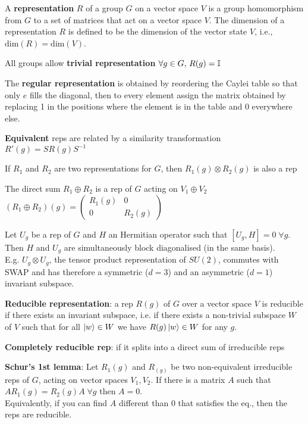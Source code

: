 \begin{squishlist}
    \item A \textbf{representation} $R$ of a group $G$ on a vector space
    $V$ is a group homomorphism from $G$ to a set of matrices that act on a vector space $V$.
    The dimension of a representation $R$ is defined to be the dimension of the vector state $V$, i.e.,
    $\text{dim}(R)=\text{dim}(V)$.
    \item All groups allow \textbf{trivial representation} $\forall g \in G, \, R(g) = \mathbb{I}$
    \item The \textbf{regular representation} is obtained by reordering the Caylei table so that only $e$ fills the diagonal, then to every element assign the matrix obtained by replacing 1 in the positions where the element is in the table and 0 everywhere else.
    \item \textbf{Equivalent} reps are related by a similarity transformation $R'(g) = S R(g) S^{-1}$
    \item If $R_1$ and $R_2$ are two representations for $G$, then $R_1(g) \otimes R_2(g)$ is also a rep
    \item The direct sum $R_1 \oplus R_2$ is a rep of $G$ acting on $V_1 \oplus V_2$ \\
    $(R_1 \oplus R_2)(g) = \begin{pmatrix} R_1(g) & 0 \\ 0 & R_2(g) \end{pmatrix}$

    \item Let $U_g$ be a rep of $G$ and $H$ an Hermitian operator such that $[U_g,H] = 0 \; \forall g$. Then $H$ and $U_g$ are simultaneously block diagonalised (in the same basis). \\
    E.g. $U_g \otimes U_g$, the tensor product representation of $SU(2)$, commutes with SWAP and has therefore a symmetric ($d=3$) and an asymmetric ($d=1$) invariant subspace.
    \item \textbf{Reducible representation}: a rep $R(g)$ of $G$ over a vector space $V$ is reducible if there exists an invariant subspace, i.e. if there exists a non-trivial subspace $W$ of $V$ such that for all $\ket{w} \in W$ we have $R(g) \ket{w} \in W$ for any $g$.
    \item \textbf{Completely reducible rep}: if it splits into a direct sum of irreducible reps
    
    \item \textbf{Schur's 1st lemma}: Let $R_1(g)$ and $R_(g)$ be two non-equivalent irreducible reps of $G$, acting on vector spaces $V_1, V_2$. If there is a matrix $A$ such that \\ $A R_1(g) = R_2(g) A \; \forall g$ \quad then $A=0$.\\
    Equivalently, if you can find $A$ different than 0 that satisfies the eq., then the reps are reducible.


\end{squishlist}
